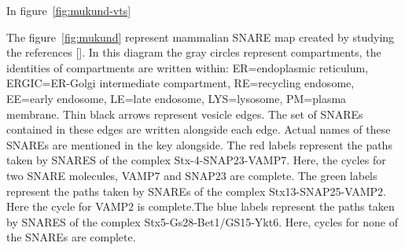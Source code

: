 In figure~\ref{fig:mukund-vts}


The figure~\ref{fig:mukund} represent mammalian SNARE map created by studying the references []. In this diagram the gray circles represent compartments, the identities of compartments are
written within: ER=endoplasmic reticulum, ERGIC=ER-Golgi intermediate compartment,
RE=recycling endosome, EE=early endosome, LE=late endosome, LYS=lysosome, PM=plasma
membrane. Thin black arrows represent vesicle edges.
The set of SNAREs contained in these edges are written alongside each edge. Actual names
of these SNAREs are mentioned in the key alongside. The red labels represent the paths taken by
SNARES of the complex Stx-4-SNAP23-VAMP7. Here, the cycles for two SNARE molecules,
VAMP7 and SNAP23 are complete. The green labels represent the paths taken by SNAREs of the
complex Stx13-SNAP25-VAMP2. Here the cycle for VAMP2 is complete.The blue labels represent
the paths taken by SNARES of the complex Stx5-Gs28-Bet1/GS15-Ykt6. Here, cycles for none of
the SNAREs are complete. 

